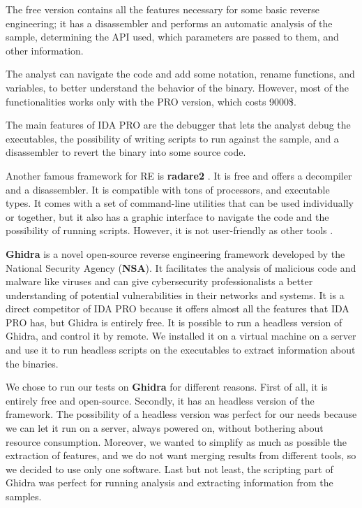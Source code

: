 The free version contains all the features necessary for some basic reverse engineering; it has a disassembler and performs an automatic analysis of the sample, determining the API used, which parameters are passed to them, and other information. 

The analyst can navigate the code and add some notation, rename functions, and variables, to better understand the behavior of the binary. However, most of the functionalities works only with the PRO version, which costs 9000\$.

The main features of IDA PRO \cite{ida} are the debugger that lets the analyst debug the executables, the possibility of writing scripts to run against the sample, and a disassembler to revert the binary into some source code. 


Another famous framework for RE is \textbf{radare2} \cite{radare2}. It is free and offers a decompiler and a disassembler.  It is compatible with tons of processors, and executable types. It comes with a set of command-line utilities that can be used individually or together, but it also has a graphic interface to navigate the code and the possibility of running scripts. However, it is not user-friendly as other tools .

\textbf{Ghidra} \cite{ghidra} is a novel open-source reverse engineering framework developed by the National Security Agency (\textbf{NSA}). It facilitates the analysis of malicious code and malware like viruses and can give cybersecurity professionalists a better understanding of potential vulnerabilities in their networks and systems. It is a direct competitor of IDA PRO because it offers almost all the features that IDA PRO has, but Ghidra is entirely free. It is possible to run a headless version of Ghidra, and control it by remote. We installed it on a virtual machine on a server and use it to run headless scripts on the executables to extract information about the binaries.

We chose to run our tests on \textbf{Ghidra} for different reasons. First of all, it is entirely free and open-source.
Secondly, it has an headless version of the framework. The possibility of a headless version was perfect for our needs because we can let it run on a server, always powered on, without bothering about resource consumption. 
Moreover, we wanted to simplify as much as possible the extraction of features, and we do not want merging results from different tools, so we decided to use only one software. 
Last but not least, the scripting part of Ghidra was perfect for running analysis and extracting information from the samples. 

